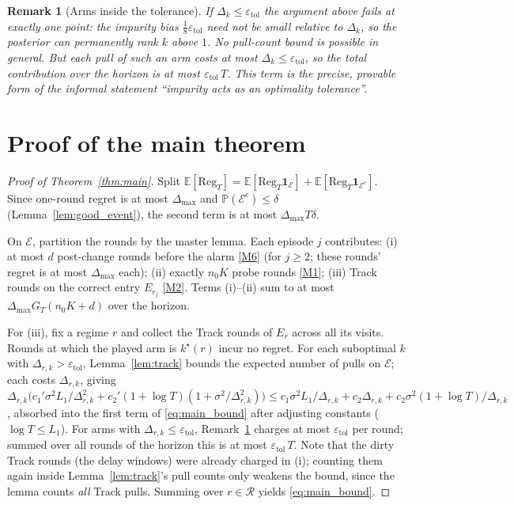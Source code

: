 \documentclass[11pt]{article}
\newtheorem{remark}{Remark}
\newcommand{\Ecal}{\mathcal E}
\newcommand{\Rcal}{\mathcal R}
\newcommand{\E}{\mathbb E}
\newcommand{\Pbb}{\mathbb P}
\newcommand{\one}{\mathbf 1}
\newcommand{\Reg}{\mathrm{Reg}}
\newcommand{\etol}{\varepsilon_{\mathrm{tol}}}
\begin{document}
\begin{remark}[Arms inside the tolerance]
\label{rem:tolerance_arms}
If $\Delta_k\le\etol$ the argument above fails at exactly one point: the impurity bias $\tfrac18\etol$ need not be small relative to $\Delta_k$, so the posterior can permanently rank $k$ above $1$. No pull-count bound is possible in general. But each pull of such an arm costs at most $\Delta_k\le\etol$, so the total contribution over the horizon is at most $\etol\,T$. This term is the precise, provable form of the informal statement ``impurity acts as an optimality tolerance''.
\end{remark}

\section{Proof of the main theorem}

\begin{proof}[Proof of Theorem~\ref{thm:main}]
Split $\E[\Reg_T]=\E[\Reg_T\one_\Ecal]+\E[\Reg_T\one_{\Ecal^c}]$. Since one-round regret is at most $\Delta_{\max}$ and $\Pbb(\Ecal^c)\le\delta$ (Lemma~\ref{lem:good_event}), the second term is at most $\Delta_{\max}T\delta$.

On $\Ecal$, partition the rounds by the master lemma. Each episode $j$ contributes: (i) at most $d$ post-change rounds before the alarm \ref{M6} (for $j\ge2$; these rounds' regret is at most $\Delta_{\max}$ each); (ii) exactly $n_0K$ probe rounds \ref{M1}; (iii) Track rounds on the correct entry $E_{r_j}$ \ref{M2}. Terms (i)--(ii) sum to at most $\Delta_{\max}G_T(n_0K+d)$ over the horizon.

For (iii), fix a regime $r$ and collect the Track rounds of $E_r$ across all its visits. Rounds at which the played arm is $k^\star(r)$ incur no regret. For each suboptimal $k$ with $\Delta_{r,k}>\etol$, Lemma~\ref{lem:track} bounds the expected number of pulls on $\Ecal$; each costs $\Delta_{r,k}$, giving
$\Delta_{r,k}\bigl(c_1'\sigma^2L_1/\Delta_{r,k}^2+c_2'(1+\log T)(1+\sigma^2/\Delta_{r,k}^2)\bigr)
\le c_1\sigma^2L_1/\Delta_{r,k}+c_2\Delta_{r,k}+c_2\sigma^2(1+\log T)/\Delta_{r,k}$,
absorbed into the first term of \eqref{eq:main_bound} after adjusting constants ($\log T\le L_1$). For arms with $\Delta_{r,k}\le\etol$, Remark~\ref{rem:tolerance_arms} charges at most $\etol$ per round; summed over all rounds of the horizon this is at most $\etol\,T$. Note that the dirty Track rounds (the delay windows) were already charged in (i); counting them again inside Lemma~\ref{lem:track}'s pull counts only weakens the bound, since the lemma counts \emph{all} Track pulls. Summing over $r\in\Rcal$ yields \eqref{eq:main_bound}.
\end{proof}
\end{document}
